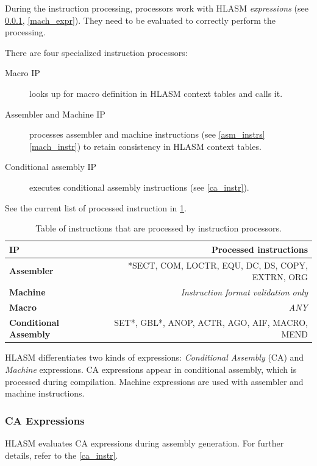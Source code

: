 During the instruction processing, processors work with HLASM \emph{expressions} (see \cref{ca_expr:logic}, \cref{mach_expr}). They need to be evaluated to correctly perform the processing.

There are four specialized instruction processors:
\begin{description}
	\item[Macro IP] looks up for macro definition in HLASM context tables and calls it.
	\item[Assembler and Machine IP] processes assembler and machine instructions (see \cref{asm_instrs} \cref{mach_instr}) to retain consistency in HLASM context tables.
	\item[Conditional assembly IP] executes conditional assembly instructions (see \cref{ca_instr}). 
	
\end{description}

See the current list of processed instruction in \cref{tab06:instr_proc}.

\begin{table}
	\centering
	\begin{tabular}{lr}
		\textbf{IP}                   &                  \textbf{Processed instructions} \\ \toprule
		\textbf{Assembler}            & *SECT, COM, LOCTR, EQU, DC, DS, COPY, EXTRN, ORG \\
		\textbf{Machine}              &        \emph{Instruction format validation only} \\
		\textbf{Macro}                &                                       \emph{ANY} \\
		\textbf{Conditional Assembly} &    SET*, GBL*, ANOP, ACTR, AGO, AIF, MACRO, MEND \\ \bottomrule
	\end{tabular}
	\caption{Table of instructions that are processed by instruction processors.}
	\label{tab06:instr_proc}
\end{table}

HLASM differentiates two kinds of expressions: \emph{Conditional Assembly} (CA) and \emph{Machine} expressions. CA expressions appear in conditional assembly, which is processed during compilation. Machine expressions are used with assembler and machine instructions.

\subsubsection{CA Expressions}
\label{ca_expr:logic}
HLASM evaluates CA expressions during assembly generation. For further details, refer to the \cref{ca_instr}.

